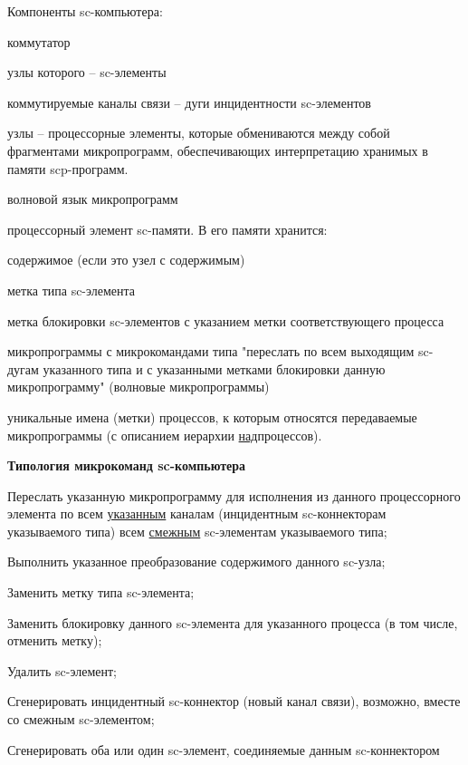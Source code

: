 
Компоненты sc-компьютера:

\begin{textitemize}
	\item коммутатор
	\begin{textitemize}
		\item узлы которого -- sc-элементы
		\item коммутируемые каналы связи -- дуги инцидентности sc-элементов
		\item узлы -- процессорные элементы, которые обмениваются между собой фрагментами микропрограмм, обеспечивающих интерпретацию хранимых в памяти scp-программ.
		\item волновой язык микропрограмм
	\end{textitemize}
	\item процессорный элемент sc-памяти. В его памяти хранится:
	\begin{textitemize}
		\item содержимое (если это узел с содержимым)
		\item метка типа sc-элемента
		\item метка блокировки sc-элементов с указанием метки соответствующего процесса
		\item микропрограммы с микрокомандами типа "переслать по всем выходящим sc-дугам указанного типа и с указанными метками блокировки данную микропрограмму" (волновые микропрограммы)
		\item уникальные имена (метки) процессов, к которым относятся передаваемые микропрограммы (с описанием иерархии \underline{над}процессов).
	\end{textitemize}
\end{textitemize}

\textbf{Типология микрокоманд sc-компьютера}
\begin{textitemize}
	\item Переслать указанную микропрограмму для исполнения из данного процессорного элемента по всем \underline{указанным} каналам (инцидентным sc-коннекторам указываемого типа) всем \underline{смежным} sc-элементам указываемого типа;
	\item Выполнить указанное преобразование содержимого данного sc-узла;
	\item Заменить метку типа sc-элемента;
	\item Заменить блокировку данного sc-элемента для указанного процесса (в том числе, отменить метку);
	\item Удалить sc-элемент;
	\item Сгенерировать инцидентный sc-коннектор (новый канал связи), возможно, вместе со смежным sc-элементом;
	\item Сгенерировать оба или один sc-элемент, соединяемые данным sc-коннектором
\end{textitemize}

